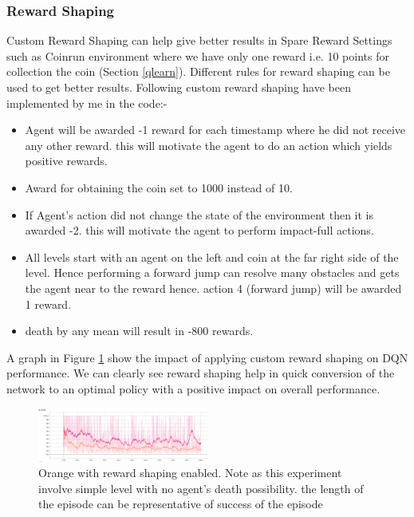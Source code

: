 \documentclass[10pt,twocolumn,letterpaper]{article}
\begin{document}
\subsubsection{Reward Shaping}

Custom Reward Shaping can help give better results in Spare Reward Settings such as Coinrun environment where we have only one reward i.e. 10 points for collection the coin (Section \ref{qlearn}). Different rules for reward shaping can be used to get better results. Following custom reward shaping have been implemented by me in the code:-

\begin{itemize}
    \item Agent will be awarded -1 reward for each timestamp where he did not receive any other reward. this will motivate the agent to do an action which yields positive rewards.
    \item Award for obtaining the coin set to 1000 instead of 10.
    \item If Agent's action did not change the state of the environment then it is awarded -2. this will motivate the agent to perform impact-full actions.
    \item All levels start with an agent on the left and coin at the far right side of the level. Hence performing a forward jump can resolve many obstacles and gets the agent near to the reward hence. action 4 (forward jump) will be awarded 1 reward.
    \item death by any mean will result in -800 rewards. 
\end{itemize}

A graph in Figure \ref{fig:Num1Seed8_1000} show the impact of applying custom reward shaping on DQN performance. We can clearly see reward shaping help in quick conversion of the network to an optimal policy with a positive impact on overall performance.

\begin{figure}[h]
   \centering
    \includegraphics[width=0.50\textwidth]{images/Num1Seed8_1000.png}
    \caption{ Orange with reward shaping enabled. Note as this experiment involve simple level with no agent's death possibility. the length of the episode can be representative of success of the episode }
    \label{fig:Num1Seed8_1000}
\end{figure}
\end{document}
